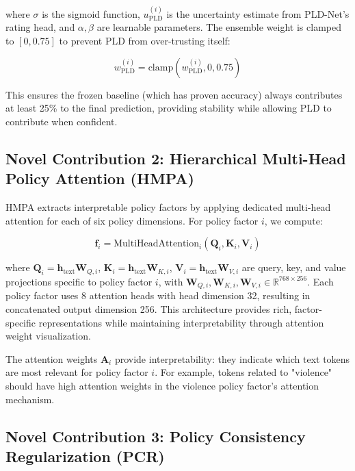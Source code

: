 \documentclass[11pt]{article}
\begin{document}
where $\sigma$ is the sigmoid function, $u_{\text{PLD}}^{(i)}$ is the uncertainty estimate from PLD-Net's rating head, and $\alpha, \beta$ are learnable parameters. The ensemble weight is clamped to $[0, 0.75]$ to prevent PLD from over-trusting itself:

\begin{equation}
w_{\text{PLD}}^{(i)} = \text{clamp}(w_{\text{PLD}}^{(i)}, 0, 0.75)
\end{equation}

This ensures the frozen baseline (which has proven accuracy) always contributes at least 25\% to the final prediction, providing stability while allowing PLD to contribute when confident.

\subsection{Novel Contribution 2: Hierarchical Multi-Head Policy Attention (HMPA)}

HMPA extracts interpretable policy factors by applying dedicated multi-head attention for each of six policy dimensions. For policy factor $i$, we compute:

\begin{equation}
\mathbf{f}_i = \text{MultiHeadAttention}_i(\mathbf{Q}_i, \mathbf{K}_i, \mathbf{V}_i)
\end{equation}

where $\mathbf{Q}_i = \mathbf{h}_{\text{text}} \mathbf{W}_{Q,i}$, $\mathbf{K}_i = \mathbf{h}_{\text{text}} \mathbf{W}_{K,i}$, $\mathbf{V}_i = \mathbf{h}_{\text{text}} \mathbf{W}_{V,i}$ are query, key, and value projections specific to policy factor $i$, with $\mathbf{W}_{Q,i}, \mathbf{W}_{K,i}, \mathbf{W}_{V,i} \in \mathbb{R}^{768 \times 256}$. Each policy factor uses 8 attention heads with head dimension 32, resulting in concatenated output dimension 256. This architecture provides rich, factor-specific representations while maintaining interpretability through attention weight visualization.

The attention weights $\mathbf{A}_i$ provide interpretability: they indicate which text tokens are most relevant for policy factor $i$. For example, tokens related to "violence" should have high attention weights in the violence policy factor's attention mechanism.

\subsection{Novel Contribution 3: Policy Consistency Regularization (PCR)}
\end{document}
